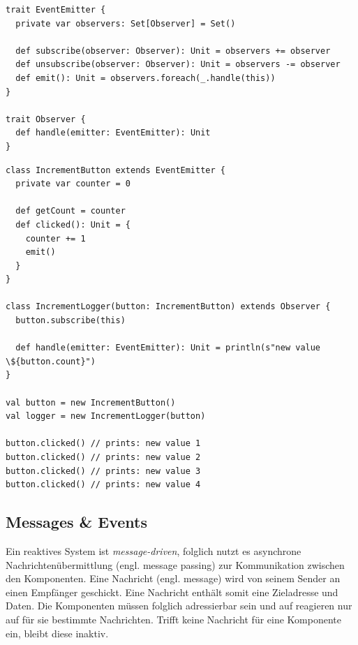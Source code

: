\begin{lstlisting}[caption={Codebeispiel für das Observer-Pattern.},label={lst:lst5}]
trait EventEmitter {
  private var observers: Set[Observer] = Set()

  def subscribe(observer: Observer): Unit = observers += observer
  def unsubscribe(observer: Observer): Unit = observers -= observer
  def emit(): Unit = observers.foreach(_.handle(this))
}

trait Observer {
  def handle(emitter: EventEmitter): Unit
}
\end{lstlisting}

\pagebreak

\begin{lstlisting}[caption={Codebeispiel für das Observer-Pattern.},label={lst:lst6}]
class IncrementButton extends EventEmitter {
  private var counter = 0

  def getCount = counter
  def clicked(): Unit = {
    counter += 1
    emit()
  }
}

class IncrementLogger(button: IncrementButton) extends Observer {
  button.subscribe(this)

  def handle(emitter: EventEmitter): Unit = println(s"new value \${button.count}")
}

val button = new IncrementButton()
val logger = new IncrementLogger(button)

button.clicked() // prints: new value 1
button.clicked() // prints: new value 2
button.clicked() // prints: new value 3
button.clicked() // prints: new value 4
\end{lstlisting}

\subsection{Messages \& Events}
Ein reaktives System ist \textit{message-driven}, folglich nutzt es asynchrone Nachrichtenübermittlung (engl. message passing) zur Kommunikation zwischen den Komponenten. Eine Nachricht (engl. message) wird von seinem Sender an einen Empfänger geschickt. Eine Nachricht enthält somit eine Zieladresse und Daten. Die Komponenten müssen folglich adressierbar sein und auf reagieren nur auf für sie bestimmte Nachrichten. Trifft keine Nachricht für eine Komponente ein, bleibt diese inaktiv.



